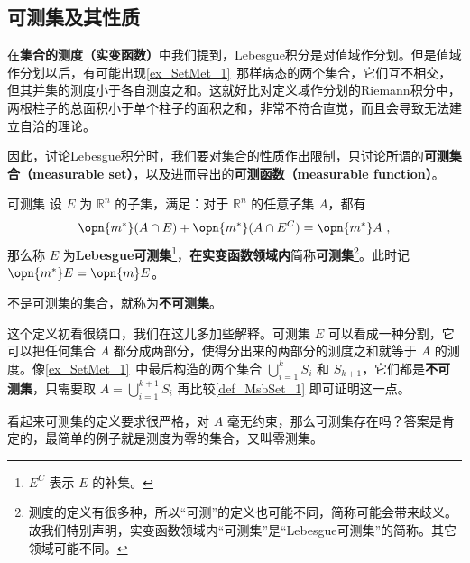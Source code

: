 

\subsection{可测集及其性质}

在\textbf{集合的测度（实变函数）}中我们提到，Lebesgue积分是对值域作分划。但是值域作分划以后，有可能出现\autoref{ex_SetMet_1}~那样病态的两个集合，它们互不相交，但其并集的测度小于各自测度之和。这就好比对定义域作分划的Riemann积分中，两根柱子的总面积小于单个柱子的面积之和，非常不符合直觉，而且会导致无法建立自洽的理论。

因此，讨论Lebesgue积分时，我们要对集合的性质作出限制，只讨论所谓的\textbf{可测集合（measurable set）}，以及进而导出的\textbf{可测函数（measurable function）}。

\begin{definition}{可测集}\label{def_MsbSet_1}
设 $E$ 为 $\mathbb{R}^n$ 的子集，满足：对于 $\mathbb{R}^n$ 的任意子集 $A$，都有
\begin{equation}
\opn{m^*}(A\cap E)+\opn{m^*}(A\cap E^C)=\opn{m^*}A~,
\end{equation}
那么称 $E$ 为\textbf{Lebesgue可测集}\footnote{$E^C$ 表示 $E$ 的补集。}，\textbf{在实变函数领域内}简称\textbf{可测集}\footnote{测度的定义有很多种，所以“可测”的定义也可能不同，简称可能会带来歧义。故我们特别声明，实变函数领域内“可测集”是“Lebesgue可测集”的简称。其它领域可能不同。}。此时记 $\opn{m^*}E=\opn{m}E$。

不是可测集的集合，就称为\textbf{不可测集}。

\end{definition}

这个定义初看很绕口，我们在这儿多加些解释。可测集 $E$ 可以看成一种分割，它可以把任何集合 $A$ 都分成两部分，使得分出来的两部分的测度之和就等于 $A$ 的测度。像\autoref{ex_SetMet_1}~中最后构造的两个集合 $\bigcup_{i=1}^k S_i$ 和 $S_{k+1}$，它们都是\textbf{不可测集}，只需要取 $A=\bigcup^{k+1}_{i=1} S_i$ 再比较\autoref{def_MsbSet_1} 即可证明这一点。

看起来可测集的定义要求很严格，对 $A$ 毫无约束，那么可测集存在吗？答案是肯定的，最简单的例子就是测度为零的集合，又叫零测集。

